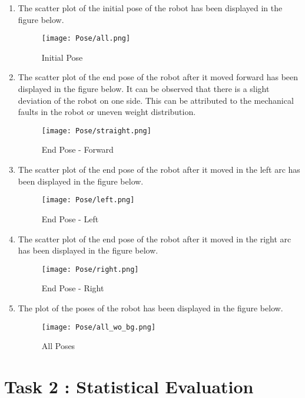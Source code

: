 \documentclass[10pt,a4paper]{article}
\begin{document}
\begin{enumerate}
	\item
	The scatter plot of the initial pose of the robot has been displayed in the figure below.

\begin{figure}[H]
	\centering
	\texttt{[image: Pose/all.png]}
	\caption{Initial Pose}
\end{figure}

\newpage
\item
The scatter plot of the end pose of the robot after it moved forward has been displayed in the figure below.
It can be observed that there is a slight deviation of the robot on one side. This can be attributed to the 
mechanical faults in the robot or uneven weight distribution.
\begin{figure}[H]
	\centering
	\texttt{[image: Pose/straight.png]}
	\caption{End Pose - Forward}
\end{figure}



\newpage
\item
The scatter plot of the end pose of the robot after it moved in the left arc has been displayed in the figure below.

\begin{figure}[H]
	\centering
	\texttt{[image: Pose/left.png]}
	\caption{End Pose - Left}
\end{figure}


\newpage
\item
The scatter plot of the end pose of the robot after it moved in the right arc has been displayed in the figure below.

\begin{figure}[H]
	\centering
	\texttt{[image: Pose/right.png]}
	\caption{End Pose - Right}
\end{figure}



\newpage
\item
The plot of the poses of the robot has been displayed in the figure below.

\begin{figure}[H]
	\centering
	\texttt{[image: Pose/all\_wo\_bg.png]}
	\caption{All Poses}
\end{figure}


\end{enumerate}

\newpage
\section{Task 2 : Statistical Evaluation}
\end{document}
